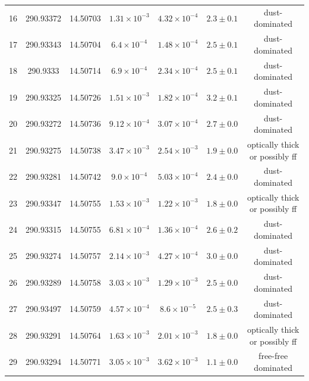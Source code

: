 \begin{table}
\begin{tabular}{ccccccc}
16 & 290.93372 & 14.50703 & $1.31\times10^{-3}$ & $4.32\times10^{-4}$ & $2.3\pm0.1$ & dust-dominated \\
17 & 290.93343 & 14.50704 & $6.4\times10^{-4}$ & $1.48\times10^{-4}$ & $2.5\pm0.1$ & dust-dominated \\
18 & 290.9333 & 14.50714 & $6.9\times10^{-4}$ & $2.34\times10^{-4}$ & $2.5\pm0.1$ & dust-dominated \\
19 & 290.93325 & 14.50726 & $1.51\times10^{-3}$ & $1.82\times10^{-4}$ & $3.2\pm0.1$ & dust-dominated \\
20 & 290.93272 & 14.50736 & $9.12\times10^{-4}$ & $3.07\times10^{-4}$ & $2.7\pm0.0$ & dust-dominated \\
21 & 290.93275 & 14.50738 & $3.47\times10^{-3}$ & $2.54\times10^{-3}$ & $1.9\pm0.0$ & optically thick or possibly ff \\
22 & 290.93281 & 14.50742 & $9.0\times10^{-4}$ & $5.03\times10^{-4}$ & $2.4\pm0.0$ & dust-dominated \\
23 & 290.93347 & 14.50755 & $1.53\times10^{-3}$ & $1.22\times10^{-3}$ & $1.8\pm0.0$ & optically thick or possibly ff \\
24 & 290.93315 & 14.50755 & $6.81\times10^{-4}$ & $1.36\times10^{-4}$ & $2.6\pm0.2$ & dust-dominated \\
25 & 290.93274 & 14.50757 & $2.14\times10^{-3}$ & $4.27\times10^{-4}$ & $3.0\pm0.0$ & dust-dominated \\
26 & 290.93289 & 14.50758 & $3.03\times10^{-3}$ & $1.29\times10^{-3}$ & $2.5\pm0.0$ & dust-dominated \\
27 & 290.93497 & 14.50759 & $4.57\times10^{-4}$ & $8.6\times10^{-5}$ & $2.5\pm0.3$ & dust-dominated \\
28 & 290.93291 & 14.50764 & $1.63\times10^{-3}$ & $2.01\times10^{-3}$ & $1.8\pm0.0$ & optically thick or possibly ff \\
29 & 290.93294 & 14.50771 & $3.05\times10^{-3}$ & $3.62\times10^{-3}$ & $1.1\pm0.0$ & free-free dominated \\
\end{tabular}
\end{table}
